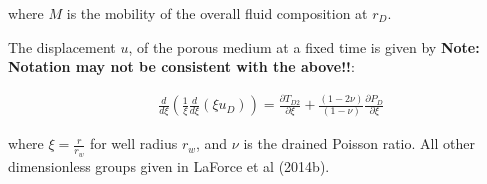 \documentclass[12pt]{report}
\begin{document}
\noindent where $M$ is the mobility of the overall fluid composition
at $r_D$.

The displacement $u$, of the porous medium at a fixed time is given by
{\bf Note: Notation may not be consistent with the above!!}:

\begin{eqnarray}
&&\frac{d}{d \xi}\left(\frac{1}{\xi}\frac{d}{d \xi}(\xi u_D)\right) = \frac{\partial T_{D2}}{\partial \xi}+
\frac{(1-2\nu)}{(1-\nu)}\frac{\partial P_D}{\partial \xi}\label{eqn:disp_u}
\end{eqnarray}

\noindent where $\xi = \frac{r}{r_w}$ for well radius $r_w$, and $\nu$ is the drained Poisson ratio.  All other dimensionless groups given in LaForce et al (2014b).


\end{document}
